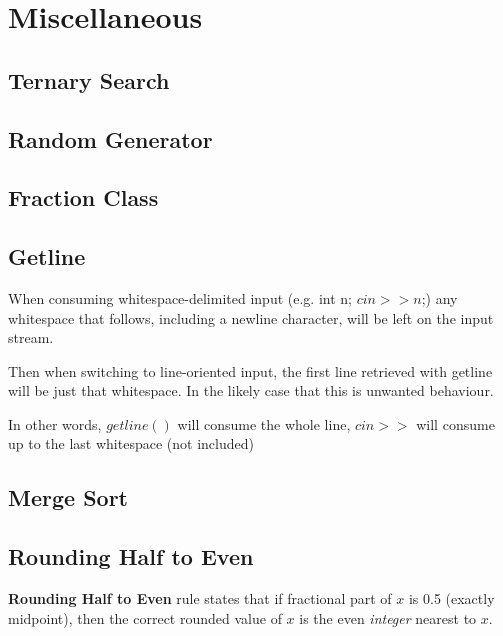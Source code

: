 \chapter{Miscellaneous}

\section{Ternary Search}


\section{Random Generator}


\section{Fraction Class}


\section{Getline}

    When consuming whitespace-delimited input (e.g. int n; $cin >> n$;) any whitespace that follows, 
    including a newline character, will be left on the input stream. 

    Then when switching to line-oriented input, the first line retrieved with getline will be just that whitespace. In the likely case that this is unwanted behaviour.

    In other words, $getline()$ will consume the whole line, $cin>>$ will consume up to the last whitespace (not included) 


\section{Merge Sort}


\section{Rounding Half to Even}

    \textbf{Rounding Half to Even} rule states that 
    if fractional part of $x$ is 0.5 (exactly midpoint), then the correct rounded value of $x$ is the even \textit{integer} nearest to $x$.

